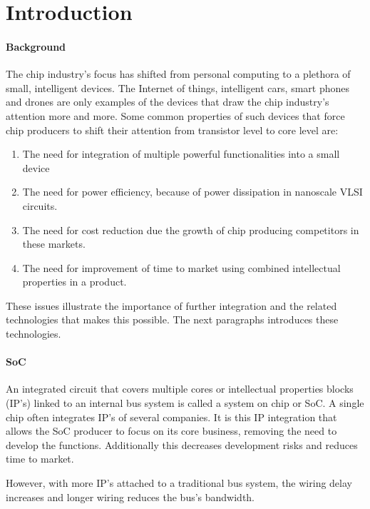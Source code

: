 \section{Introduction}

\paragraph{Background} \cite{SoC-market}

The chip industry's focus has shifted from personal computing to a plethora of
small, intelligent devices. The Internet of things, intelligent cars, smart
phones and drones are only examples of the devices that draw the chip industry's
attention more and more. Some common properties of such devices that force chip
producers to shift their attention from transistor level to core level are:

\begin{enumerate}
\item The need for integration of multiple powerful functionalities into a small device
\item The need for power efficiency, because of power dissipation in nanoscale VLSI circuits. 
\item The need for cost reduction due the growth of chip producing competitors in these markets.
\item The need for improvement of time to market using combined intellectual properties in a product.
\end{enumerate}

These issues illustrate the importance of further integration and the related
technologies that makes this possible. The next paragraphs introduces these
technologies.

\paragraph{SoC}

An integrated circuit that covers multiple cores or intellectual properties
blocks (IP's) linked to an internal bus system is called a system on chip or
SoC. A single chip often integrates IP's of several companies. It is this IP
integration that allows the SoC producer to focus on its core business, removing
the need to develop the functions. Additionally this decreases development risks
and reduces time to market.

However, with more IP's attached to a traditional bus system, the wiring delay increases 
and longer wiring reduces the bus's bandwidth.\cite{SoC}

